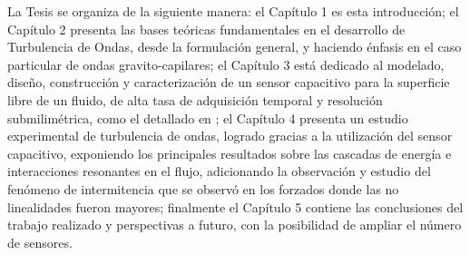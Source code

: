 La Tesis se organiza de la siguiente manera: el Capítulo 1 es esta introducción; el Capítulo 2 presenta las bases teóricas fundamentales en el desarrollo de Turbulencia de Ondas, desde la formulación general, y haciendo énfasis en el caso particular de ondas gravito-capilares; el Capítulo 3 está dedicado al modelado, diseño, construcción y caracterización de un sensor capacitivo para la superficie libre de un fluido, de alta tasa de adquisición temporal y resolución submilimétrica, como el detallado en \cite{gordillozavaletaNonpropagatingHydrodynamicSolitons2012}; el Capítulo 4 presenta un estudio experimental de turbulencia de ondas, logrado gracias a la utilización del sensor capacitivo, exponiendo los principales resultados sobre las cascadas de energía e interacciones resonantes en el flujo, adicionando la observación y estudio del fenómeno de intermitencia que se observó en los forzados donde las no linealidades fueron mayores; finalmente el Capítulo 5 contiene las conclusiones del trabajo realizado y perspectivas a futuro, con la posibilidad de ampliar el número de sensores. %















%
 




